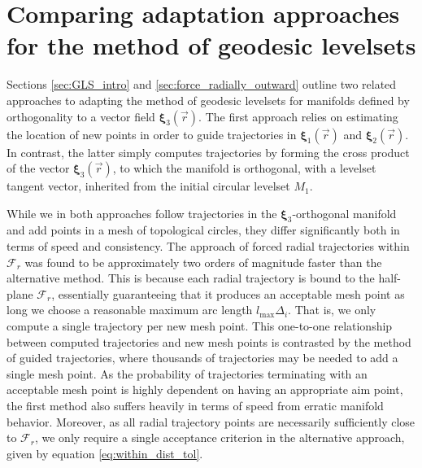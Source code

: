 

\section{Comparing adaptation approaches for the method of geodesic levelsets}\label{sec:method_selection}

Sections \ref{sec:GLS_intro} and \ref{sec:force_radially_outward} outline two related approaches to adapting the method of geodesic levelsets for manifolds defined by orthogonality to a vector field $\bm{\xi}_3(\vec{r})$. The first approach relies on estimating the location of new points in order to guide trajectories in $\bm{\xi}_1(\vec{r})$  and $\bm{\xi}_2(\vec{r})$. In contrast, the latter simply computes trajectories by forming the cross product of the vector $\bm{\xi}_3(\vec{r})$, to which the manifold is orthogonal, with a levelset tangent vector, inherited from the initial circular levelset $M_1$. 

While we in both approaches follow trajectories in the $\bm{\xi}_3$-orthogonal manifold and add points in a mesh of topological circles, they differ significantly both in terms of speed and consistency. The approach of forced radial trajectories within $\mathcal{F}_r$ was found to be approximately two orders of magnitude faster than the alternative method. This is because each radial trajectory is bound to the half-plane $\mathcal{F}_r$, essentially guaranteeing that it produces an acceptable mesh point as long we choose a reasonable maximum arc length $l_{\text{max}}\Delta_i$. That is, we only compute a single trajectory per new mesh point. This one-to-one relationship between computed trajectories and new mesh points is contrasted by the method of guided trajectories, where thousands of trajectories may be needed to add a single mesh point. As the probability of trajectories terminating with an acceptable mesh point is highly dependent on having an appropriate aim point, the first method also suffers heavily in terms of speed from erratic manifold behavior. Moreover, as all radial trajectory points are necessarily sufficiently close to $\mathcal{F}_r$, we only require a single acceptance criterion in the alternative approach, given by equation \eqref{eq:within_dist_tol}.

